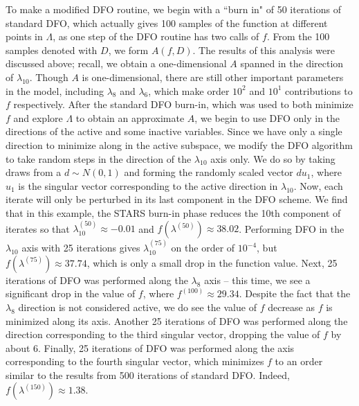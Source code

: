 \documentclass{amsart}
\begin{document}
To make a modified DFO routine, we begin with a ``burn in" of 50 iterations of standard DFO, which actually gives 100 samples of the function at different points in $\Lambda$, as one step of the DFO routine has two calls of $f$. From the 100 samples denoted with $D$, we form $A(f,D)$. The results of this analysis were discussed above; recall, we obtain a one-dimensional $A$ spanned in the direction of $\lambda_{10}$. Though $A$ is one-dimensional, there are still other important parameters in the model, including $\lambda_8$ and $\lambda_6$, which make order $10^2$ and $10^1$ contributions to $f$ respectively. After the standard DFO burn-in, which was used to both minimize $f$ and explore $\Lambda$ to obtain an approximate $A$, we begin to use DFO only in the directions of the active and some inactive variables. Since we have only a single direction to minimize along in the active subspace, we modify the DFO algorithm to take random steps in the direction of the $\lambda_{10}$ axis only. We do so by taking draws from a $ d \sim N(0,1)$ and forming the randomly scaled vector $du_1$, where $u_1$ is the singular vector corresponding to the active direction in $\lambda_{10}$. Now, each iterate will only be perturbed in its last component in the DFO scheme. We find that in this example, the STARS burn-in phase reduces the 10th component of iterates so that $\lambda^{(50)}_{10} \approx -0.01$ and $f(\lambda^{(50)})\approx 38.02$. Performing DFO in the $\lambda_{10}$ axis with 25 iterations gives $\lambda^{(75)}_{10}$ on the order of $10^{-4}$, but $f(\lambda^{(75)}) \approx 37.74$, which is only a small drop in the function value. Next, 25 iterations of DFO was performed along the $\lambda_8$ axis -- this time, we see a significant drop in the value of $f$, where $f^{(100)} \approx 29.34$. Despite the fact that the $\lambda_8$ direction is not considered active, we do see the value of $f$ decrease as $f$ is minimized along its axis. Another 25 iterations of DFO was performed along the direction corresponding to the third singular vector, dropping the value of $f$ by about 6. Finally, 25 iterations of DFO was performed along the axis corresponding to the fourth singular vector, which minimizes $f$ to an order similar to the results from 500 iterations of standard DFO. Indeed, $f(\lambda^{(150)})\approx 1.38$.
\end{document}
